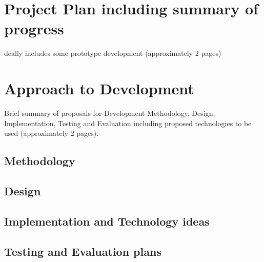 \documentclass[11pt,titlepage,dvipsnames,table,xcdraw]{article}
\begin{document}
\section{Project Plan including summary of progress}
deally includes some prototype development
(approximately 2 pages)
\clearpage

\section{Approach to Development}
Brief summary of proposals for Development Methodology, Design, Implementation, Testing
and Evaluation including proposed technologies to be used (approximately 2 pages).
\subsection{Methodology}
\subsection{Design}
\subsection{Implementation and Technology ideas}
\subsection{Testing and Evaluation plans}
\clearpage


\clearpage

\clearpage
{}  %


\clearpage
\end{document}

